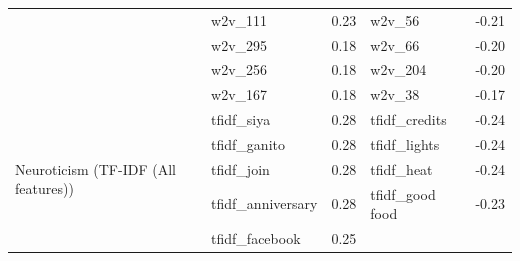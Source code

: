 \begin{table}[htbp]
{\begin{tabular}{@{} l l c l c @{}}
		& w2v\_111            & 0.23 & w2v\_56  & -0.21 \\
		& w2v\_295            & 0.18 & w2v\_66  & -0.20 \\
		& w2v\_256            & 0.18 & w2v\_204 & -0.20 \\
		& w2v\_167            & 0.18 & w2v\_38  & -0.17 \\
		\cmidrule(lr){1-5}
		\multirow[b]{5}{*}{Neuroticism (TF-IDF (All features))} 
		& tfidf\_siya      & 0.28 & tfidf\_credits   & -0.24 \\
		& tfidf\_ganito    & 0.28 & tfidf\_lights    & -0.24 \\
		& tfidf\_join      & 0.28 & tfidf\_heat      & -0.24 \\
		& tfidf\_anniversary & 0.28 & tfidf\_good food & -0.23 \\
		& tfidf\_facebook  & 0.25 & & \\
		\bottomrule
	\end{tabular}%
    }
\end{table}

